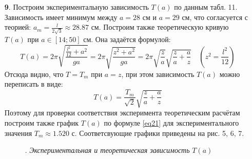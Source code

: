 \documentclass[a4paper]{article}
\begin{document}
\begin{itemize}
\item[\textbf{9}.] Построим экспериментальную зависимость $T(a)$ по данным табл. 11. Зависимость имеет минимум между $a = 28$ см и $a = 29$ см, что согласуется с теорией: $a_m = \frac{l}{2\sqrt{3}} \approx 28.87$ см. Построим также теоретическую кривую $T(a)$ при $a \in [14; 50]$ см. Она задаётся формулой: 
\begin{equation}
 T(a) = 2\pi \sqrt{\frac{\frac{l^2}{12} + a^2}{ga}} = 2\pi \sqrt{\frac{z^2+a^2}{ga}} = 2\pi \sqrt{\frac{z}{a}} \sqrt{\frac{z}{a}+\frac{a}{z}} \quad \left(z^2 = \frac{l^2}{12} \right) 
\end{equation}
Отсюда видно, что $T=T_m$ при $a = z$, при этом зависимость $T(a)$ можно переписать в виде:
\begin{equation}\label{eq21}
T(a) = \frac{T_m}{\sqrt{2}} \sqrt{\frac{z}{a}+\frac{a}{z}}
\end{equation}
Поэтому для проверки соответствия эксперимента теоретическим расчётам построим также график $T(a)$ по формуле \eqref{eq21} для экспериментального значения $T_m \approx 1.520$ с. Соответсвующие графики приведены на рис. 5, 6, 7.
\begin{figure}
\caption{. \textit{Экспериментальная и теоретическая зависимость} $T(a)$}
\end{figure}
\begin{figure}

\end{figure}
\end{itemize}
\end{document}
